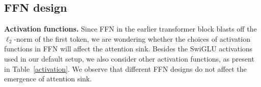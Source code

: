 

\subsection{FFN design} 

\textbf{Activation functions.} Since FFN in the earlier transformer block blasts off the $\ell_2$-norm of the first token, we are wondering whether the choices of activation functions in FFN will affect the attention sink. Besides the SwiGLU activations used in our default setup, we also consider other activation functions, as present in Table~\ref{activation}. We observe that different FFN designs do not affect the emergence of attention sink.


